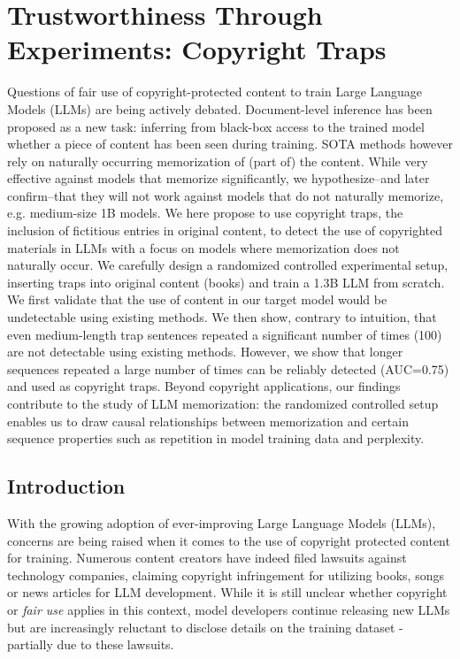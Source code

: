 \setchapterpreamble[u]{\margintoc}
\chapter{Trustworthiness Through Experiments: Copyright Traps}



\begin{kaobox}[frametitle=Paper Abstract]

Questions of fair use of copyright-protected content to train Large Language Models (LLMs) are being actively debated. Document-level inference has been proposed as a new task: inferring from black-box access to the trained model whether a piece of content has been seen during training. SOTA methods however rely on naturally occurring memorization of (part of) the content. While very effective against models that memorize significantly, we hypothesize--and later confirm--that they will not work against models that do not naturally memorize, e.g. medium-size 1B models. We here propose to use copyright traps, the inclusion of fictitious entries in original content, to detect the use of copyrighted materials in LLMs with a focus on models where memorization does not naturally occur. We carefully design a randomized controlled experimental setup, inserting traps into original content (books) and train a 1.3B LLM from scratch. We first validate that the use of content in our target model would be undetectable using existing methods. We then show, contrary to intuition, that even medium-length trap sentences repeated a significant number of times (100) are not detectable using existing methods. However, we show that longer sequences repeated a large number of times can be reliably detected (AUC=0.75) and used as copyright traps. 
Beyond copyright applications, our findings contribute to the study of LLM memorization: the randomized controlled setup enables us to draw causal relationships between memorization and certain sequence properties such as repetition in model training data and perplexity.

\end{kaobox}

\section{Introduction}





With the growing adoption of ever-improving Large Language Models (LLMs), concerns are being raised when it comes to the use of copyright protected content for training. 
Numerous content creators have indeed filed lawsuits against technology companies, claiming copyright infringement for utilizing books, songs or news articles for LLM development. While it is still unclear whether copyright or \emph{fair use} applies in this context, model developers continue releasing new LLMs but are increasingly reluctant to disclose details on the training dataset - partially due to these lawsuits. 


